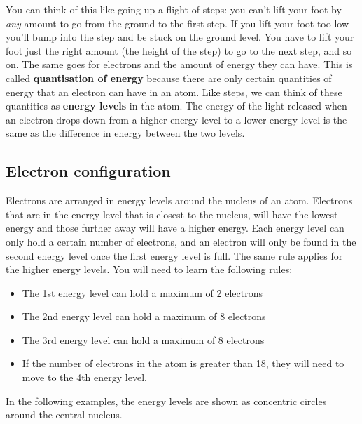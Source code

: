 You can think of this like going up a flight of steps: you can't lift your foot by \textit{any} amount to go from the ground to the first step. If you lift your foot too low you'll bump into the step and be stuck on the ground level. You have to lift your foot just the right amount (the height of the step) to go to the next step, and so on. The same goes for electrons and the amount of energy they can have. This is called \textbf{quantisation of energy} because there are only certain quantities of energy that an electron can have in an atom. Like steps, we can think of these quantities as \textbf{energy levels} in the atom. The energy of the light released when an electron drops down from a higher energy level to a lower energy level is the same as the difference in energy between the two levels.


\subsection{Electron configuration}

Electrons are arranged in energy levels around the nucleus of an atom. Electrons that are in the energy level that is closest to the nucleus, will have the lowest energy and those further away will have a higher energy. Each energy level can only hold a certain number of electrons, and an electron will only be found in the second energy level once the first energy level is full. The same rule applies for the higher energy levels. You will need to learn the following rules:

\begin{itemize}
\item{The 1st energy level can hold a maximum of 2 electrons}
\item{The 2nd energy level can hold a maximum of 8 electrons}
\item{The 3rd energy level can hold a maximum of 8 electrons}
\item{If the number of electrons in the atom is greater than 18, they will need to move to the 4th energy level.}
\end{itemize}

In the following examples, the energy levels are shown as concentric circles around the central nucleus. 

